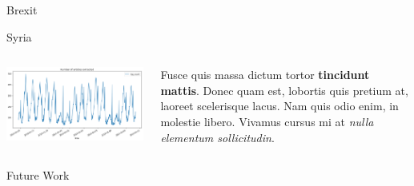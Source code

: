 \documentclass[final]{beamer}
\newlength{\twocolwid}
\begin{document}
\begin{frame}[t]
\begin{columns}[t]
\begin{column}{\twocolwid}
\begin{block}{Brexit {}}
\end{block}


\begin{block}{Syria}
    \begin{columns}[onlytextwidth]
        \begin{column}{.45\textwidth}
            \includegraphics[width=0.8\linewidth]{log_extraction.png} 
        \end{column}
        \begin{column}{.55\textwidth}
            Fusce quis massa dictum tortor \textbf{tincidunt mattis}. Donec quam est, lobortis quis pretium at, laoreet scelerisque lacus. Nam quis odio enim, in molestie libero. Vivamus cursus mi at \textit{nulla elementum sollicitudin}.
        \end{column}
    \end{columns}
\end{block}


\begin{block}{Future Work {}}

    \small{} \\
    
\end{block}



\end{column}
\end{columns}
\end{frame}
\end{document}
